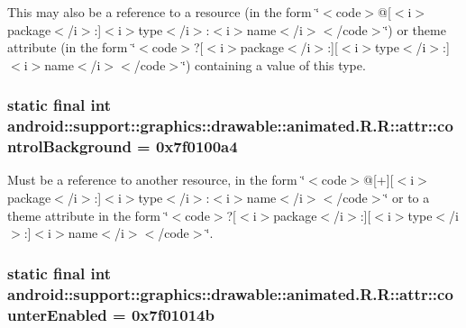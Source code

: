 This may also be a reference to a resource (in the form \char`\"{}$<$code$>$@\mbox{[}$<$i$>$package$<$/i$>$:\mbox{]}$<$i$>$type$<$/i$>$:$<$i$>$name$<$/i$>$$<$/code$>$\char`\"{}) or theme attribute (in the form \char`\"{}$<$code$>$?\mbox{[}$<$i$>$package$<$/i$>$:\mbox{]}\mbox{[}$<$i$>$type$<$/i$>$:\mbox{]}$<$i$>$name$<$/i$>$$<$/code$>$\char`\"{}) containing a value of this type. \hypertarget{classandroid_1_1support_1_1graphics_1_1drawable_1_1animated_1_1_r_1_1attr_6a12f9299c8d1380c795dda0df1b0839}{
\subsubsection[{controlBackground}]{\setlength{\rightskip}{0pt plus 5cm}static final int android::support::graphics::drawable::animated.R.R::attr::controlBackground = 0x7f0100a4}}
\label{classandroid_1_1support_1_1graphics_1_1drawable_1_1animated_1_1_r_1_1attr_6a12f9299c8d1380c795dda0df1b0839}


Must be a reference to another resource, in the form \char`\"{}$<$code$>$@\mbox{[}+\mbox{]}\mbox{[}$<$i$>$package$<$/i$>$:\mbox{]}$<$i$>$type$<$/i$>$:$<$i$>$name$<$/i$>$$<$/code$>$\char`\"{} or to a theme attribute in the form \char`\"{}$<$code$>$?\mbox{[}$<$i$>$package$<$/i$>$:\mbox{]}\mbox{[}$<$i$>$type$<$/i$>$:\mbox{]}$<$i$>$name$<$/i$>$$<$/code$>$\char`\"{}. \hypertarget{classandroid_1_1support_1_1graphics_1_1drawable_1_1animated_1_1_r_1_1attr_d76095e13082479039b377903273e310}{
\subsubsection[{counterEnabled}]{\setlength{\rightskip}{0pt plus 5cm}static final int android::support::graphics::drawable::animated.R.R::attr::counterEnabled = 0x7f01014b}}
\label{classandroid_1_1support_1_1graphics_1_1drawable_1_1animated_1_1_r_1_1attr_d76095e13082479039b377903273e310}



